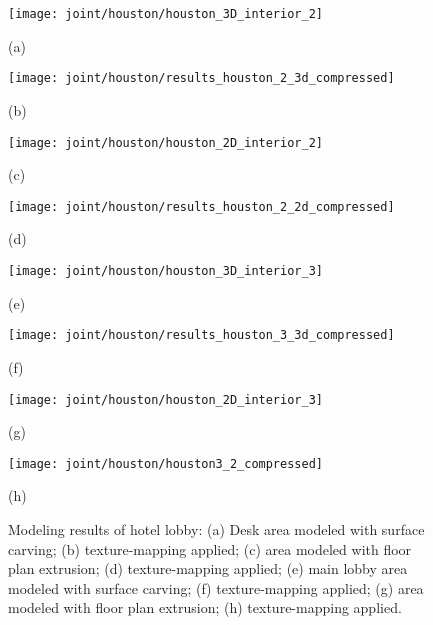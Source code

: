 \documentclass[journal]{IEEEtran}
\begin{document}
\begin{figure*}[t]

	\begin{minipage}[t]{0.24\linewidth}
		\centerline{\texttt{[image: joint/houston/houston\_3D\_interior\_2]}}
		\centerline{(a)}\medskip
	\end{minipage}
	\hfill
	\begin{minipage}[t]{0.24\linewidth}
		\centerline{\texttt{[image: joint/houston/results\_houston\_2\_3d\_compressed]}}
		\centerline{(b)}\medskip
	\end{minipage}
	\hfill
	\begin{minipage}[t]{0.24\linewidth}
		\centerline{\texttt{[image: joint/houston/houston\_2D\_interior\_2]}}
		\centerline{(c)}\medskip
	\end{minipage}
	\hfill
	\begin{minipage}[t]{0.24\linewidth}
		\centerline{\texttt{[image: joint/houston/results\_houston\_2\_2d\_compressed]}}
		\centerline{(d)}\medskip
	\end{minipage}
	
	\begin{minipage}[t]{0.24\linewidth}
		\centerline{\texttt{[image: joint/houston/houston\_3D\_interior\_3]}}
		\centerline{(e)}\medskip
	\end{minipage}
	\hfill
	\begin{minipage}[t]{0.24\linewidth}
		\centerline{\texttt{[image: joint/houston/results\_houston\_3\_3d\_compressed]}}
		\centerline{(f)}\medskip
	\end{minipage}
	\hfill
	\begin{minipage}[t]{0.24\linewidth}
		\centerline{\texttt{[image: joint/houston/houston\_2D\_interior\_3]}}
		\centerline{(g)}\medskip
	\end{minipage}
	\hfill
	\begin{minipage}[t]{0.24\linewidth}
		\centerline{\texttt{[image: joint/houston/houston3\_2\_compressed]}}
		\centerline{(h)}\medskip
	\end{minipage}

	\caption{Modeling results of hotel lobby: (a) Desk area modeled with surface carving; (b) texture-mapping applied; (c) area modeled with floor plan extrusion; (d) texture-mapping applied; (e) main lobby area modeled with surface carving; (f) texture-mapping applied; (g) area modeled with floor plan extrusion; (h) texture-mapping applied.}
	\label{fig:houston}

\end{figure*}
\end{document}
